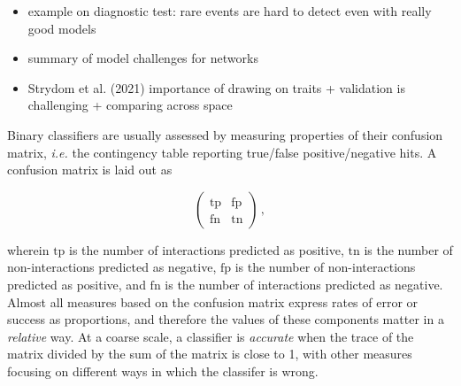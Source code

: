 \documentclass[11pt]{article}
\begin{document}
\vfill

\clearpage
\linenumbers
\pagestyle{normal}

\begin{itemize}
\tightlist
\item
  example on diagnostic test: rare events are hard to detect even with
  really good models
\item
  summary of model challenges for networks
\item
  Strydom et al. (2021) importance of drawing on traits + validation is
  challenging + comparing across space
\end{itemize}

Binary classifiers are usually assessed by measuring properties of their
confusion matrix, \emph{i.e.} the contingency table reporting true/false
positive/negative hits. A confusion matrix is laid out as

\[\begin{pmatrix}
    \text{tp} & \text{fp} \\
    \text{fn} & \text{tn}
\end{pmatrix} \,,\]

wherein \(\text{tp}\) is the number of interactions predicted as
positive, \(\text{tn}\) is the number of non-interactions predicted as
negative, \(\text{fp}\) is the number of non-interactions predicted as
positive, and \(\text{fn}\) is the number of interactions predicted as
negative. Almost all measures based on the confusion matrix express
rates of error or success as proportions, and therefore the values of
these components matter in a \emph{relative} way. At a coarse scale, a
classifier is \emph{accurate} when the trace of the matrix divided by
the sum of the matrix is close to 1, with other measures focusing on
different ways in which the classifer is wrong.
\end{document}

